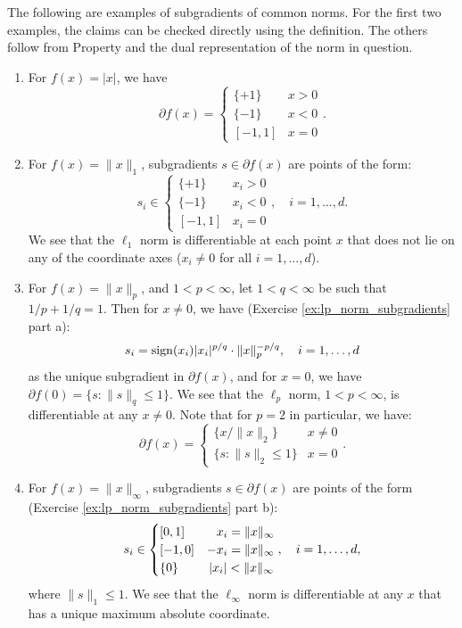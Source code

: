 \begin{Example}
\label{xa:norm_subgradients}
The following are examples of subgradients of common norms. For the first two
examples, the claims can be checked directly using the definition. The others
follow from Property  and the dual
representation of the norm in question. %

\begin{enumerate}[label=\alph*., ref=\alph*]
\item For $f(x) = |x|$, we have 
  \[
  \partial f(x) = \begin{cases}
  \{+1\} & x > 0 \\
  \{-1\} & x < 0 \\
  [-1,1] & x = 0
  \end{cases}.
  \]

\item {}
  For $f(x) = \|x\|_1$, subgradients $s \in \partial f(x)$ are points of the
  form:  
  \[
  s_i \in \begin{cases}
  \{+1\} & x_i > 0 \\
  \{-1\} & x_i < 0 \\
  [-1,1] & x_i = 0
  \end{cases}, \quad i=1,\ldots,d.
  \]
  We see that the $\ell_1$ norm is differentiable at each point $x$ that does
  not lie on any of the coordinate axes ($x_i \not=0$ for all 
  $i=1,\ldots,d$).  

\item {}
  For $f(x) = \|x\|_p$, and $1 < p < \infty$, let $1 < q < \infty$ be such that
  $1/p + 1/q = 1$. Then for $x \not= 0$, we have (Exercise
  \ref{ex:lp_norm_subgradients} part a):   
  \[
  s_i = \operatorname{sign}(x_i) |x_i|^{p/q} \cdot \|x\|_p^{-p/q}, \quad i=1,\ldots,d 
  \]
  as the unique subgradient in $\partial f(x)$, and for $x=0$, we have $\partial
  f(0) = \{s : \|s\|_q \leq 1\}$. We see that the $\ell_p$ norm, $1 < p <
  \infty$, is differentiable at any $x \not= 0$. Note that for $p=2$ in
  particular, we have:
  \[
  \partial f(x) = \begin{cases}
  \{x / \|x\|_2\} & x \not= 0 \\
  \{s : \|s\|_2 \leq 1\} & x = 0
  \end{cases}.
  \]

\item {} 
  For $f(x) = \|x\|_\infty$, subgradients $s \in \partial f(x)$ are points of
  the form (Exercise \ref{ex:lp_norm_subgradients} part b): 
  \[
  s_i \in \begin{cases}
  [0,1] & \hphantom{-} x_i = \|x\|_\infty \\   
  [-1,0] & -x_i = \|x\|_\infty \\
  \{0\} & \, |x_i| < \|x\|_\infty 
  \end{cases}, \quad i=1,\ldots,d,
  \]
  where $\|s\|_1 \leq 1$. We see that the $\ell_\infty$ norm is differentiable
  at any $x$ that has a unique maximum absolute coordinate.  


\end{enumerate}
\end{Example}
